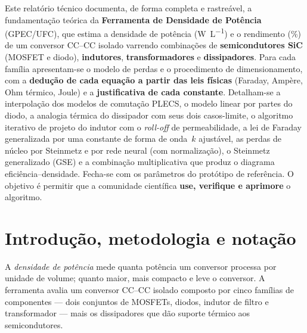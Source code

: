 \documentclass[
	a4paper, 12pt,
	chapter=TITLE, section=Title, subsection=Title,
	oneside, english, brazil, fleqn
]{abntex2}
\begin{document}
	\imprimircapa

	\begin{resumo}
		Este relatório técnico documenta, de forma completa e rastreável, a
		fundamentação teórica da \textbf{Ferramenta de Densidade de Potência}
		(GPEC/UFC), que estima a densidade de potência (\si{\watt\per\liter}) e o
		rendimento (\si{\percent}) de um conversor CC--CC isolado varrendo
		combinações de \textbf{semicondutores SiC} (MOSFET e diodo),
		\textbf{indutores}, \textbf{transformadores} e \textbf{dissipadores}.
		Para cada família apresentam-se o modelo de perdas e o procedimento de
		dimensionamento, com a \textbf{dedução de cada equação a partir das leis
		físicas} (Faraday, Ampère, Ohm térmico, Joule) e a \textbf{justificativa
		de cada constante}. Detalham-se a interpolação dos modelos de comutação
		PLECS, o modelo linear por partes do diodo, a analogia térmica do
		dissipador com seus dois casos-limite, o algoritmo iterativo de projeto
		do indutor com o \emph{roll-off} de permeabilidade, a lei de Faraday
		generalizada por uma constante de forma de onda~$k$ ajustável, as perdas
		de núcleo por Steinmetz e por rede neural (com normalização), o Steinmetz
		generalizado (GSE) e a combinação multiplicativa que produz o diagrama
		eficiência--densidade. Fecha-se com os parâmetros do protótipo de
		referência. O objetivo é permitir que a comunidade científica
		\textbf{use, verifique e aprimore} o algoritmo.
	\end{resumo}

	\imprimirsumario

	\textual

\chapter{Introdução, metodologia e notação}
A \emph{densidade de potência} mede quanta potência um conversor processa por
unidade de volume; quanto maior, mais compacto e leve o conversor. A ferramenta
avalia um conversor CC--CC isolado composto por cinco famílias de componentes
--- dois conjuntos de MOSFETs, diodos, indutor de filtro e transformador --- mais
os dissipadores que dão suporte térmico aos semicondutores.
\end{document}
